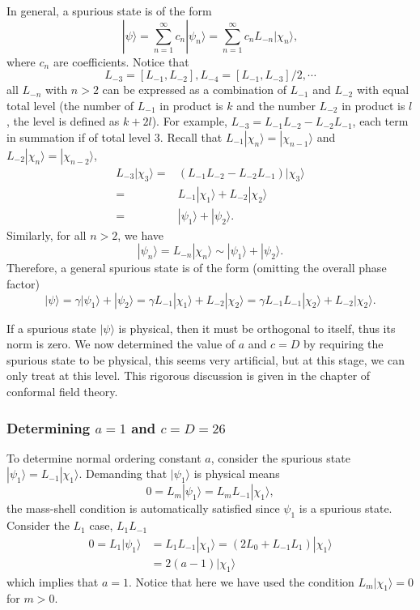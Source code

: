 \documentclass[graybox,envcountchap,sectrefs]{svmono}
\begin{document}
In general, a spurious state is of the form
\begin{equation}
|\psi\rangle=\sum_{n=1}^{\infty}c_n|\psi_n\rangle=\sum_{n=1}^{\infty}c_nL_{-n}|\chi_n\rangle,
\end{equation}
where $c_n$ are coefficients. Notice that
\begin{equation}
L_{-3}=[L_{-1},L_{-2}], L_{-4}=[L_{-1},L_{-3}]/2,\cdots	
\end{equation}
all $L_{-n}$ with $n>2$ can be expressed as a combination of $L_{-1}$ and $L_{-2}$ with equal total level (the number of $L_{-1}$ in product is $k$ and the number $L_{-2}$ in product is $l$, the level is defined as $k+2l$). For example, $L_{-3}=L_{-1}L_{-2}-L_{-2}L_{-1}$, each term in summation if of total level $3$. Recall that $L_{-1}|\chi_{n}\rangle=|\chi_{n-1}\rangle$ and $L_{-2}|\chi_n\rangle=|\chi_{n-2}\rangle$, 
\begin{align}
L_{-3}|\chi_3\rangle=&(L_{-1}L_{-2}-L_{-2}L_{-1})	|\chi_3\rangle\nonumber\\
=&L_{-1}|\chi_1\rangle+L_{-2}|\chi_{2}\rangle\nonumber\\
=&|\psi_1\rangle+|\psi_2\rangle.
\end{align}
Similarly, for all $n>2$, we have
\begin{equation}
	|\psi_n\rangle=L_{-n}|\chi_n\rangle\sim |\psi_1\rangle+|\psi_2\rangle.
\end{equation}
Therefore, a general spurious state is of the form (omitting the overall phase factor)
\begin{equation}\label{eq:spurious}
|\psi\rangle=\gamma|\psi_1\rangle+|\psi_2\rangle=\gamma L_{-1}|\chi_1\rangle+ L_{-2}|\chi_2\rangle=\gamma L_{-1}L_{-1}|\chi_2\rangle+ L_{-2}|\chi_2\rangle.	
\end{equation}

If a spurious state $|\psi\rangle$ is physical, then it must be orthogonal to itself, thus its norm is zero. We now determined the value of $a$ and $c=D$ by requiring the spurious state to be physical, this seems very artificial, but at this stage, we can only treat at this level. This rigorous discussion is given in the chapter of conformal field theory.

\subsubsection*{Determining $a=1$ and $c=D=26$}
To determine normal ordering constant $a$, consider the spurious state $|\psi_1\rangle=L_{-1}|\chi_1\rangle$. 
Demanding that $|\psi_1\rangle$ is physical means
\begin{equation}
0=L_m|\psi_1\rangle=L_mL_{-1}|\chi_1\rangle,	
\end{equation}
the mass-shell condition is automatically satisfied since $\psi_1$ is a spurious state.
Consider the $L_1$ case, $L_1L_{-1}$
\begin{align}
0=L_1|\psi_1\rangle&=L_1L_{-1}|\chi_1\rangle=(2L_0+L_{-1}L_1)|\chi_1\rangle \nonumber \\
&=2(a-1)|\chi_1\rangle
\end{align}
which implies that $a=1$. Notice that here we have used the condition $L_m |\chi_1\rangle=0$ for $m>0$.
\end{document}
